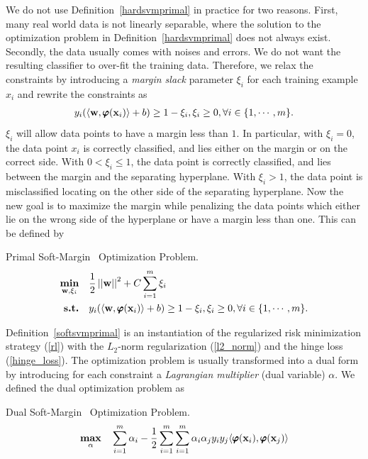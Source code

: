 {%
We do not use Definition~\ref{hardsvmprimal} in practice for two reasons. 
First, many real world data is not linearly separable, where the solution to the optimization problem in Definition~\ref{hardsvmprimal} does not always exist.
Secondly, the data usually comes with noises and errors.
We do not want the resulting classifier to over-fit the training data.
Therefore, we relax the constraints by introducing a \textit{margin slack} parameter $\xi_i$ for each training example $x_i$ and rewrite the constraints as 
\begin{align}
	y_i(\langle \mathbf {w}, \pmb \varphi(\mathbf {x}_i) \rangle + b) \ge 1-\xi_i, \xi_i\ge 0, \forall i\in\{1,\cdots,m\}. \label{softsvmconstraint}
\end{align}
$\xi_i$ will allow data points to have a margin less than $1$.
In particular, with $\xi_i=0$, the data point $x_i$ is correctly classified, and lies either on the margin or on the correct side.
With $0<\xi_i\le 1$, the data point is correctly classified, and lies between the margin and the separating hyperplane.
With $\xi_i>1$, the data point is misclassified locating on the other side of the separating hyperplane.
Now the new goal is to maximize the margin while penalizing the data points which either lie on the wrong side of the hyperplane or have a margin less than one.
This can be defined by
\begin{definition}{Primal Soft-Margin \svm\ Optimization Problem.}\label{softsvmprimal}
	\begin{align*}
		\underset{\mathbf {w},\xi_i}{\textbf{min}} & \quad\frac{1}{2}\left|\left| \mathbf {w} \right|\right|^2 + C\sum_{i=1}^{m}\xi_i\\
		\textbf{s.t.} & \quad y_i(\langle \mathbf {w}, \pmb \varphi(\mathbf {x}_i) \rangle + b) \ge 1-\xi_i, \xi_i\ge 0, \forall i\in\{1,\cdots,m\}.
	\end{align*}
\end{definition}
\noindent
Definition~\ref{softsvmprimal} is an instantiation of the regularized risk minimization strategy (\ref{rl}) with the $L_2$-norm regularization (\ref{l2_norm}) and the hinge loss (\ref{hinge_loss}).
The optimization problem is usually transformed into a dual form by introducing for each constraint a \textit{Lagrangian multiplier} (dual variable) $\alpha$.
We defined the dual optimization problem as
\begin{definition}{Dual Soft-Margin \svm\ Optimization Problem.}\label{softsvmdual}
	\begin{align*}
		\underset{\valpha}{\maximize} & \quad\sum_{i=1}^{m}\alpha_i -\frac{1}{2}\sum_{i=1}^{m}\sum_{i=1}^{m}\alpha_i\alpha_jy_iy_j\ip{\varphib(\vx_i)}{\varphib(\vx_j)}\\

\end{align*}
\end{definition}}
